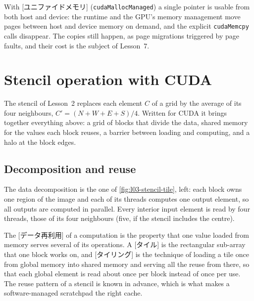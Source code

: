 \documentclass[../main.tex]{subfiles}
\begin{document}
\begin{definition}
  With [ユニファイドメモリ]
  (\texttt{cudaMallocManaged}) a single pointer is usable from both host
  and device: the runtime
  and the GPU's memory management move pages between host and device
  memory on demand, and the explicit \texttt{cudaMemcpy} calls disappear.
  The copies still happen, as page migrations triggered by page faults,
  and their cost is the subject of Lesson~7.
\end{definition}

\section{Stencil operation with CUDA}
\label{sec:l03-stencil}

The stencil of Lesson~2 replaces each element $C$ of a grid by the
average of its four neighbours, $C' = (N + W + E + S)/4$.  Written for
CUDA it brings together everything above: a grid of blocks that divide
the data, shared memory for the values each block reuses, a barrier
between loading and computing, and a halo at the block
edges.

\subsection{Decomposition and reuse}

The data decomposition is the one of \cref{fig:l03-stencil-tile}, left:
each block owns one region of the image and each of its threads computes
one output element, so all outputs are computed in parallel.  Every interior
input element is read by four threads, those of its four neighbours
(five, if the stencil includes the centre).

\begin{definition}
  The [データ再利用] of a computation is the property
  that one value loaded from memory serves several of its operations.  A [タイル] is the
  rectangular sub-array that one block works on, and
  [タイリング] is the technique of loading a tile once from
  global memory into shared memory and serving all the reuse from there,
  so that each global element is read about once per block instead of
  once per use.  The reuse pattern of a stencil is known in advance, which
  is what makes a software-managed scratchpad the right
  cache.
\end{definition}
\end{document}
